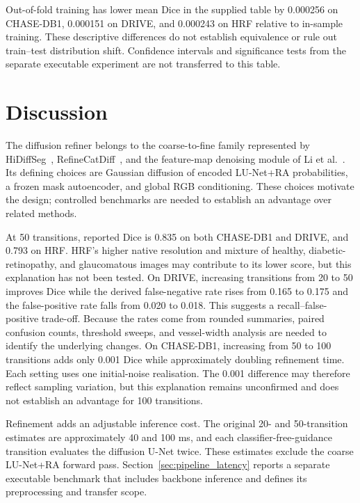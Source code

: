 \documentclass[jimaging,article,submit,pdftex,moreauthors]{Definitions/mdpi}%
\begin{document}
Out-of-fold training has lower mean Dice in the supplied table by 0.000256 on CHASE-DB1, 0.000151 on DRIVE, and 0.000243 on HRF relative to in-sample training. These descriptive differences do not establish equivalence or rule out train--test distribution shift. Confidence intervals and significance tests from the separate executable experiment are not transferred to this table.

\section{Discussion}

\label{sec:discussion}



The diffusion refiner belongs to the coarse-to-fine family represented by HiDiffSeg~\cite{HiDiffSeg}, RefineCatDiff~\cite{RefineCatDiff}, and the feature-map denoising module of Li et al.~\cite{DiffusionFMD}. Its defining choices are Gaussian diffusion of encoded LU-Net+RA probabilities, a frozen mask autoencoder, and global RGB conditioning. These choices motivate the design; controlled benchmarks are needed to establish an advantage over related methods.



At 50 transitions, reported Dice is 0.835 on both CHASE-DB1 and DRIVE, and 0.793 on HRF. HRF's higher native resolution and mixture of healthy, diabetic-retinopathy, and glaucomatous images may contribute to its lower score, but this explanation has not been tested. On DRIVE, increasing transitions from 20 to 50 improves Dice while the derived false-negative rate rises from 0.165 to 0.175 and the false-positive rate falls from 0.020 to 0.018. This suggests a recall--false-positive trade-off. Because the rates come from rounded summaries, paired confusion counts, threshold sweeps, and vessel-width analysis are needed to identify the underlying changes. On CHASE-DB1, increasing from 50 to 100 transitions adds only 0.001 Dice while approximately doubling refinement time. Each setting uses one initial-noise realisation. The 0.001 difference may therefore reflect sampling variation, but this explanation remains unconfirmed and does not establish an advantage for 100 transitions.



Refinement adds an adjustable inference cost. The original 20- and 50-transition estimates are approximately 40 and 100 ms, and each classifier-free-guidance transition evaluates the diffusion U-Net twice. These estimates exclude the coarse LU-Net+RA forward pass. Section~\ref{sec:pipeline_latency} reports a separate executable benchmark that includes backbone inference and defines its preprocessing and transfer scope.
\end{document}
